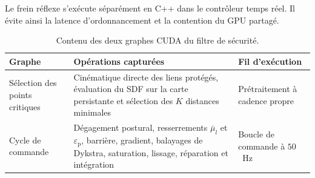 Le frein réflexe s'exécute séparément en C++ dans le contrôleur temps réel. Il évite ainsi la latence d'ordonnancement et la contention du \ac{GPU} partagé.

\begin{table}[htpb]
\centering
\caption{Contenu des deux graphes \acs{CUDA} du filtre de sécurité.}
\label{tab:cuda_graphs}
\small
\begin{tabular}{>{\raggedright\arraybackslash}p{3.3cm}>{\raggedright\arraybackslash}p{7.4cm}>{\raggedright\arraybackslash}p{2.6cm}}
\toprule
Graphe & Opérations capturées & Fil d'exécution \\
\midrule
Sélection des points critiques & Cinématique directe des liens protégés, évaluation du \ac{SDF} sur la carte persistante et sélection des $K$ distances minimales & Prétraitement à cadence propre \\ \addlinespace[0.3em]
Cycle de commande & Dégagement postural, resserrements $\bar{\mu}_l$ et $\varepsilon_{\mathrm{p}}$, barrière, gradient, balayages de Dykstra, saturation, lissage, réparation et intégration & Boucle de commande à $50$~Hz \\
\bottomrule
\end{tabular}
\end{table}

